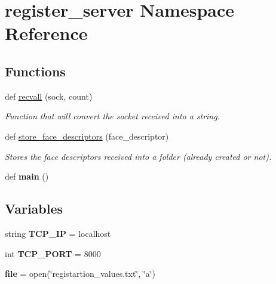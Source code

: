 \hypertarget{namespaceregister__server}{}\section{register\+\_\+server Namespace Reference}
\label{namespaceregister__server}
\subsection*{Functions}
\begin{DoxyCompactItemize}
\item 
def \hyperlink{namespaceregister__server_a67bb86c0ff90fdf0fd4c77fa7eeeb1c1}{recvall} (sock, count)
\begin{DoxyCompactList}\small\item\em Function that will convert the socket received into a string. \end{DoxyCompactList}\item 
def \hyperlink{namespaceregister__server_aaeeebb60db8fa707bc7403a86e231acc}{store\+\_\+face\+\_\+descriptors} (face\+\_\+descriptor)
\begin{DoxyCompactList}\small\item\em Stores the face descriptors received into a folder (already created or not). \end{DoxyCompactList}\item 
def {\bfseries main} ()\hypertarget{namespaceregister__server_a26e195fba8c006144aada4daa696e181}{}\label{namespaceregister__server_a26e195fba8c006144aada4daa696e181}

\end{DoxyCompactItemize}
\subsection*{Variables}
\begin{DoxyCompactItemize}
\item 
string {\bfseries T\+C\+P\+\_\+\+IP} = \textquotesingle{}localhost\textquotesingle{}\hypertarget{namespaceregister__server_afb99a27b92f7b32543a70d6b8b189c70}{}\label{namespaceregister__server_afb99a27b92f7b32543a70d6b8b189c70}

\item 
int {\bfseries T\+C\+P\+\_\+\+P\+O\+RT} = 8000\hypertarget{namespaceregister__server_aa32c493cf1ca9f8772cd6a02ceba5448}{}\label{namespaceregister__server_aa32c493cf1ca9f8772cd6a02ceba5448}

\item 
{\bfseries file} = open(\char`\"{}registartion\+\_\+values.\+txt\char`\"{}, \char`\"{}a\char`\"{})\hypertarget{namespaceregister__server_a1ce278a25a44911c33f8320c7cb50d58}{}\label{namespaceregister__server_a1ce278a25a44911c33f8320c7cb50d58}

\end{DoxyCompactItemize}


